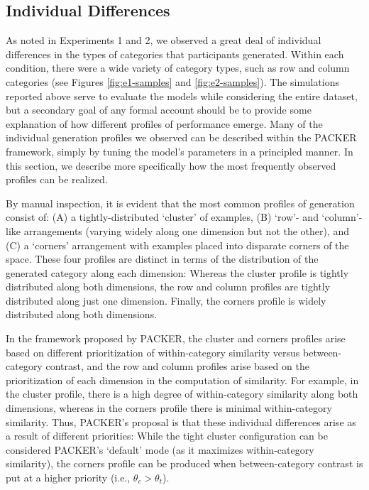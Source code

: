 \documentclass[12pt]{article}
\begin{document}
\begin{flushleft}
\subsection{Individual Differences}
\label{section:individual-diffs}

As noted in Experiments 1 and 2, we observed a great deal of individual
differences in the types of categories that participants generated. Within each
condition, there were a wide variety of category types, such as row and column
categories (see Figures \ref{fig:e1-samples} and \ref{fig:e2-samples}). The
simulations reported above serve to evaluate the models while considering the
entire dataset, but a secondary goal of any formal account should be to provide
some explanation of how different profiles of performance emerge. Many of the
individual generation profiles we observed can be described within the PACKER
framework, simply by tuning the model's parameters in a principled manner. In
this section, we describe more specifically how the most frequently observed
profiles can be realized.

By manual inspection, it is evident that the most common profiles of generation
consist of: (A) a tightly-distributed `cluster' of examples, (B) `row'- and
`column'-like arrangements (varying widely along one dimension but not the
other), and (C) a `corners' arrangement with examples placed into disparate
corners of the space. These four profiles are distinct in terms of the
distribution of the generated category along each dimension: Whereas the cluster
profile is tightly distributed along both dimensions, the row and column
profiles are tightly distributed along just one dimension. Finally, the corners
profile is widely distributed along both dimensions.

In the framework proposed by PACKER, the cluster and corners profiles arise
based on different prioritization of within-category similarity versus
between-category contrast, and the row and column profiles arise based on the
prioritization of each dimension in the computation of similarity. For example,
in the cluster profile, there is a high degree of within-category similarity
along both dimensions, whereas in the corners profile there is minimal
within-category similarity. Thus, PACKER's proposal is that these individual
differences arise as a result of different priorities: While the tight cluster
configuration can be considered PACKER's `default' mode (as it maximizes
within-category similarity), the corners profile can be produced when
between-category contrast is put at a higher priority (i.e., $\theta_c > \theta_t$).


\end{flushleft}
\end{document}
